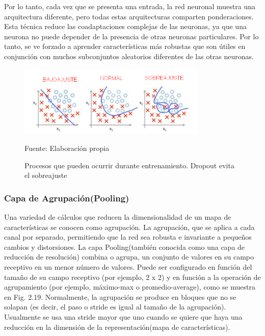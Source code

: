 		\vskip 0.4cm 
		Por lo tanto, cada vez que se presenta una entrada, la red neuronal muestra una arquitectura diferente, pero todas estas arquitecturas comparten ponderaciones. Esta técnica reduce las coadaptaciones complejas de las neuronas, ya que una neurona no puede depender de la presencia de otras neuronas particulares. Por lo tanto, se ve forzado a aprender características más robustas que son útiles en conjunción con muchos subconjuntos aleatorios diferentes de las otras neuronas.
		\begin{figure}[H]
		\begin{center}
		\includegraphics[width=0.8\textwidth]{images/marcoteorico/dropout}
		\end{center}
		\begin{center}
		\caption{\small{Procesos que pueden ocurrir durante entrenamiento. Dropout evita el sobreajuste}}
		\vskip -0.3cm  
		{\small{Fuente: Elaboración propia}}
		\end{center}
		\vspace{-1.5em}
		\end{figure}

		\vskip 0.4cm 
	\subsubsection {Capa de Agrupación(Pooling)}
		\vskip 0.4cm 

		Una variedad de cálculos que reducen la dimensionalidad de un mapa de características se conocen como agrupación. La agrupación, que se aplica a cada canal por separado, permitiendo que la red sea robusta e invariante a pequeños cambios y distorsiones. La capa Pooling(también conocida como una capa de reducción de resolución) combina o agrupa, un conjunto de valores en su campo receptivo en un menor número de valores. Puede ser configurado en función del tamaño de su campo receptivo (por ejemplo, 2 x 2) y en función a la operación de agrupamiento (por ejemplo, máximo-max o promedio-average), como se muestra en Fig. 2.19. Normalmente, la agrupación se produce en bloques que no se solapan (es decir, el paso o stride es igual al tamaño de la agrupación). Usualmente se usa una stride mayor que uno cuando se quiere que haya una reducción en la dimensión de la representación(mapa de características).

